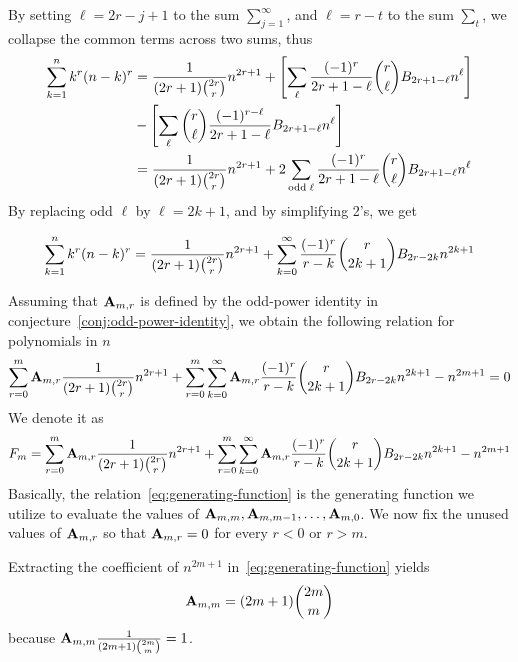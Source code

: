 By setting $\ell=2r-j+1$ to the sum $\sum_{j=1}^{\infty}$, and $\ell=r-t$ to the sum $\sum_{t}$,
we collapse the common terms across two sums, thus
\begin{align*}
    \sum_{k=1}^{n} k^{r} (n-k)^{r}
    &= \frac{1}{(2r+1) \binom{2r}r} n^{2r+1}
    + \left[ \sum_{\ell} \frac{(-1)^r}{2r+1-\ell} \binom{r}{\ell} {B}\sb{2r+1-\ell} n^{\ell} \right] \\
    &- \left[ \sum_{\ell} \binom{r}{\ell} \frac{(-1)^{r-\ell}}{2r+1-\ell} {B}\sb{2r+1-\ell} n^{\ell} \right]\\
    &= \frac{1}{(2r+1) \binom{2r}r} n^{2r+1} + 2 \sum_{\mathrm{odd \; \ell}} \frac{(-1)^r}{2r+1-\ell} \binom{r}{\ell} {B}\sb{2r+1-\ell} n^{\ell}
\end{align*}
By replacing odd $\ell$ by $\ell = 2k+1$, and by simplifying 2's, we get
\begin{proposition}
    \label{prop:bivariate-faulhabers-formula}
    \begin{align*}
        \sum_{k=1}^{n} k^{r} (n-k)^{r}
        = \frac{1}{(2r+1) \binom{2r}r} n^{2r+1}
        + \sum_{k=0}^{\infty} \frac{(-1)^r}{r-k} \binom{r}{2k+1} {B}\sb{2r-2k} n^{2k+1}
    \end{align*}
\end{proposition}

Assuming that ${\mathbf{A}} \sb{m,r}$ is defined
by the odd-power identity in conjecture~\eqref{conj:odd-power-identity},
we obtain the following relation for polynomials in $n$
\begin{align*}
    \sum_{r=0}^{m} {\mathbf{A}} \sb{m,r} \frac{1}{(2r+1) \binom{2r}{r}} n^{2r+1} + \sum_{r=0}^{m} \sum_{k=0}^{\infty} {\mathbf{A}} \sb{m,r} \frac{(-1)^r}{r-k} \binom{r}{2k+1} {B}\sb{2r-2k} n^{2k+1}  - n^{2m+1} = 0
\end{align*}
We denote it as
\begin{align}
    \label{eq:generating-function}
    F_{m} = \sum_{r=0}^{m} {\mathbf{A}} \sb{m,r} \frac{1}{(2r+1) \binom{2r}{r}} n^{2r+1} + \sum_{r=0}^{m} \sum_{k=0}^{\infty} {\mathbf{A}} \sb{m,r} \frac{(-1)^r}{r-k} \binom{r}{2k+1} {B}\sb{2r-2k} n^{2k+1}  - n^{2m+1}
\end{align}
Basically, the relation~\eqref{eq:generating-function} is the generating function we utilize to
evaluate the values of ${\mathbf{A}} \sb{m,m}, {\mathbf{A}} \sb{m,m-1}, \ldots, {\mathbf{A}} \sb{m,0}$.
We now fix the unused values of ${\mathbf{A}} \sb{m,r}$ so that ${\mathbf{A}} \sb{m,r} = 0$ for every $r < 0$ or $r > m$.

Extracting the coefficient of $n^{2m+1}$ in~\eqref{eq:generating-function} yields
\begin{align*}
    {\mathbf{A}} \sb{m,m} = (2m+1)\binom{2m}{m}
\end{align*}
because ${\mathbf{A}} \sb{m,m} \frac{1}{(2m+1) \binom{2m}{m}} = 1$.

